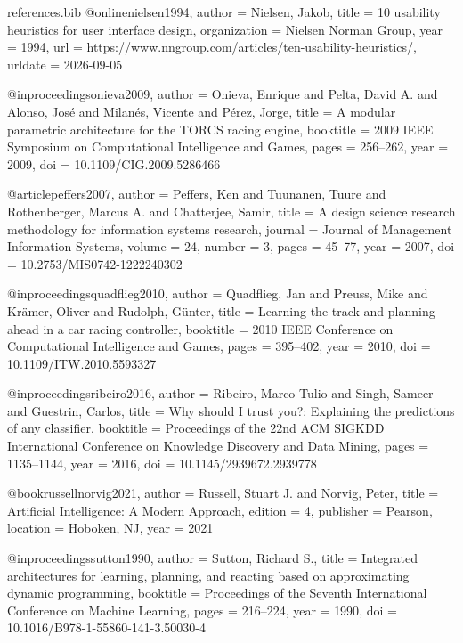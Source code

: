 \begin{filecontents*}{references.bib}
@online{nielsen1994,
  author  = {Nielsen, Jakob},
  title   = {10 usability heuristics for user interface design},
  organization = {Nielsen Norman Group},
  year    = {1994},
  url     = {https://www.nngroup.com/articles/ten-usability-heuristics/},
  urldate = {2026-09-05}
}

@inproceedings{onieva2009,
  author    = {Onieva, Enrique and Pelta, David A. and Alonso, Jos{\'e} and Milan{\'e}s, Vicente and P{\'e}rez, Jorge},
  title     = {A modular parametric architecture for the {TORCS} racing engine},
  booktitle = {2009 IEEE Symposium on Computational Intelligence and Games},
  pages     = {256--262},
  year      = {2009},
  doi       = {10.1109/CIG.2009.5286466}
}

@article{peffers2007,
  author  = {Peffers, Ken and Tuunanen, Tuure and Rothenberger, Marcus A. and Chatterjee, Samir},
  title   = {A design science research methodology for information systems research},
  journal = {Journal of Management Information Systems},
  volume  = {24},
  number  = {3},
  pages   = {45--77},
  year    = {2007},
  doi     = {10.2753/MIS0742-1222240302}
}

@inproceedings{quadflieg2010,
  author    = {Quadflieg, Jan and Preuss, Mike and Kr{\"a}mer, Oliver and Rudolph, G{\"u}nter},
  title     = {Learning the track and planning ahead in a car racing controller},
  booktitle = {2010 IEEE Conference on Computational Intelligence and Games},
  pages     = {395--402},
  year      = {2010},
  doi       = {10.1109/ITW.2010.5593327}
}

@inproceedings{ribeiro2016,
  author    = {Ribeiro, Marco Tulio and Singh, Sameer and Guestrin, Carlos},
  title     = {Why should I trust you?: Explaining the predictions of any classifier},
  booktitle = {Proceedings of the 22nd ACM SIGKDD International Conference on Knowledge Discovery and Data Mining},
  pages     = {1135--1144},
  year      = {2016},
  doi       = {10.1145/2939672.2939778}
}

@book{russellnorvig2021,
  author    = {Russell, Stuart J. and Norvig, Peter},
  title     = {Artificial Intelligence: A Modern Approach},
  edition   = {4},
  publisher = {Pearson},
  location  = {Hoboken, NJ},
  year      = {2021}
}

@inproceedings{sutton1990,
  author    = {Sutton, Richard S.},
  title     = {Integrated architectures for learning, planning, and reacting based on approximating dynamic programming},
  booktitle = {Proceedings of the Seventh International Conference on Machine Learning},
  pages     = {216--224},
  year      = {1990},
  doi       = {10.1016/B978-1-55860-141-3.50030-4}
}


\end{filecontents*}
